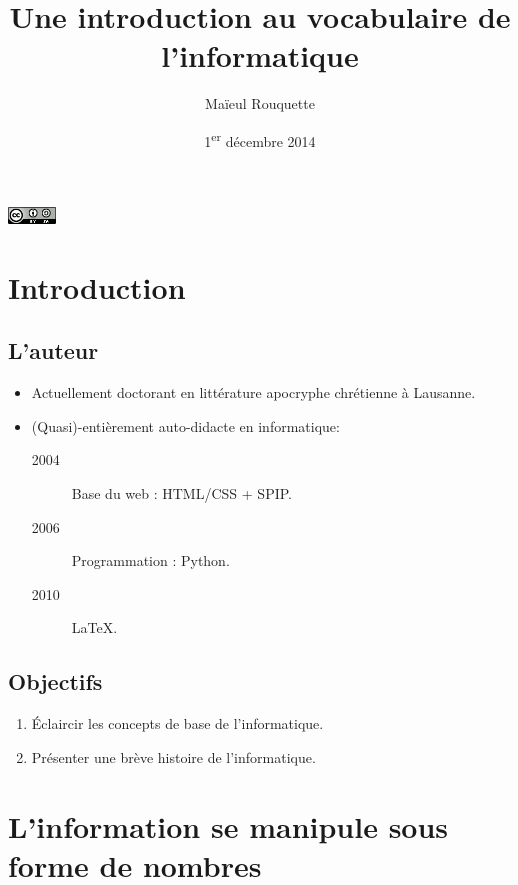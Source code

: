 \documentclass{beamer}
\author{Maïeul Rouquette}
\date{1\textsuperscript{er} décembre 2014}
\title{Une introduction au vocabulaire de l'informatique}
\begin{document}
\begin{slide}
\titlepage

\vfill
\hfill\includegraphics[width=36pt]{cc-by-sa.png}
 \hfill\hbox{}

\end{slide}


\section{Introduction}
\subsection{L'auteur}
\begin{slide}


	\begin{itemize}
		

		\item Actuellement doctorant en littérature apocryphe chrétienne à Lausanne.

		\item (Quasi)-entièrement auto-didacte en informatique:
		
		\begin{description}
			\item[2004] Base du web : HTML/CSS + SPIP.
			\item[2006] Programmation : Python.
			\item[2010] \LaTeX.
		\end{description}
	
	\end{itemize}
\end{slide}

\subsection{Objectifs}

\begin{slide}
	\begin{enumerate}
		\item Éclaircir les concepts de base de l'informatique.
		\item Présenter une brève histoire de l'informatique.
	\end{enumerate}
\end{slide}

\section{L'information se manipule sous forme de nombres}
\end{document}
